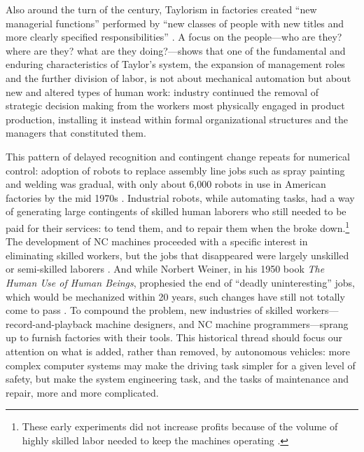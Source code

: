 
Also around the turn of the century, Taylorism in factories created ``new managerial
functions'' performed by ``new classes of people with new titles and
more clearly specified responsibilities'' \cite[p. 120]{aitken}. A focus on the
people---who are they? where are they? what are they doing?---shows that
one of the fundamental and enduring characteristics of Taylor's
system, the expansion of management roles and the further division of
labor, is not about mechanical automation but about new and altered
types of human work: industry continued
the removal of strategic decision making from the
workers most physically engaged in product production, installing it
instead within formal organizational structures and the managers that
constituted them. 


This pattern of delayed recognition and contingent change repeats for
numerical control: adoption of robots to replace assembly line jobs such
as spray painting and welding was gradual, with only
about 6,000 robots in use in American factories by the mid
1970s \cite[p. 159]{nyeAmericas}. Industrial robots, while automating tasks,
had a way of generating large contingents of skilled human laborers
who still needed to be paid for their services:  to tend them, and
to repair them when the broke down.\footnote{These early experiments did not
increase profits because of the volume of highly skilled labor needed
to keep the machines operating \cite[p. 162]{nyeAmericas}.} The development of NC machines
proceeded with a specific interest in eliminating skilled workers, but
the jobs that disappeared were largely unskilled or semi-skilled
laborers \cite[p. 164]{nyeAmericas}. And while Norbert Weiner, in his 1950 book \emph{The Human Use of
Human Beings}, prophesied the end of ``deadly uninteresting'' jobs, which
would be mechanized within 20 years, such changes have still not
totally come to pass \cite[p. 161]{nyeAmericas}. To compound the problem, new industries of
skilled workers---record-and-playback machine designers, and NC machine
programmers---sprang up to furnish factories with their tools. This
historical thread should focus our attention on what is added, rather
than removed, by
autonomous vehicles: more complex computer systems may make the driving
task simpler for a given level of safety, but make the system
engineering task, and the tasks of maintenance and repair, more and more complicated.

